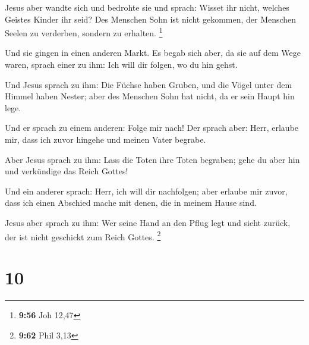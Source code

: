  Jesus aber wandte sich und bedrohte sie und sprach:
Wisset ihr nicht, welches Geistes Kinder ihr seid?  Des
Menschen Sohn ist nicht gekommen, der Menschen Seelen zu verderben,
sondern zu erhalten. \footnote{\textbf{9:56} Joh 12,47}

 Und sie gingen in einen anderen Markt. Es begab sich
aber, da sie auf dem Wege waren, sprach einer zu ihm: Ich will dir
folgen, wo du hin gehst.

 Und Jesus sprach zu ihm: Die Füchse haben Gruben, und
die Vögel unter dem Himmel haben Nester; aber des Menschen Sohn hat
nicht, da er sein Haupt hin lege.

 Und er sprach zu einem anderen: Folge mir nach! Der
sprach aber: Herr, erlaube mir, dass ich zuvor hingehe und meinen Vater
begrabe.

 Aber Jesus sprach zu ihm: Lass die Toten ihre Toten
begraben; gehe du aber hin und verkündige das Reich Gottes!

 Und ein anderer sprach: Herr, ich will dir nachfolgen;
aber erlaube mir zuvor, dass ich einen Abschied mache mit denen, die in
meinem Hause sind.

 Jesus aber sprach zu ihm: Wer seine Hand an den Pflug
legt und sieht zurück, der ist nicht geschickt zum Reich Gottes.
\footnote{\textbf{9:62} Phil 3,13}

\hypertarget{section-4}{%
\section{10}\label{section-4}}


